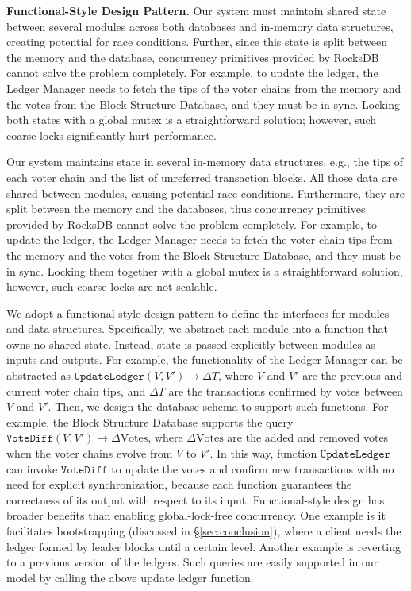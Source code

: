 \noindent\textbf{Functional-Style Design Pattern.}
Our system must maintain shared state between several modules across both databases and in-memory data structures, creating potential for race conditions. Further, since this state is split between the memory and the database, concurrency primitives provided by RocksDB cannot solve the problem completely. For example, to update the ledger, the Ledger Manager needs to fetch the tips of the voter chains from the memory and the votes from the Block Structure Database, and they must be in sync. Locking both states with a global mutex is a straightforward solution; however, such coarse locks significantly hurt performance. 

Our system maintains state in several in-memory data structures, e.g., the tips of each voter chain and the list of unreferred transaction blocks. All those data are shared between modules, causing potential race conditions. Furthermore, they are split between the memory and the databases, thus concurrency primitives provided by RocksDB cannot solve the problem completely. For example, to update the ledger, the Ledger Manager needs to fetch the voter chain tips from the memory and the votes from the Block Structure Database, and they must be in sync. Locking them together with a global mutex is a straightforward solution, however, such coarse locks are not scalable. 
\fi

We adopt a functional-style design pattern to define the interfaces for modules and data structures. Specifically, we abstract each module into a function that owns no shared state. Instead, state is passed explicitly between modules as inputs and outputs. For example, the functionality of the Ledger Manager can be abstracted as $\texttt{UpdateLedger}(V, V') \rightarrow \Delta T$, where $V$ and $V'$ are the previous and current voter chain tips, and $\Delta T$ are the transactions confirmed by votes between $V$ and $V'$. Then, we design the database schema to support such functions. For example, the Block Structure Database supports the query $\texttt{VoteDiff}(V, V') \rightarrow \Delta \text{Votes}$, where $\Delta \text{Votes}$ are the added and removed votes when the voter chains evolve from $V$ to $V'$. In this way, function $\texttt{UpdateLedger}$ can invoke $\texttt{VoteDiff}$ to update the votes and confirm new transactions with no need for explicit synchronization, because each function guarantees the correctness of its output with respect to its input. Functional-style design has broader benefits than enabling global-lock-free concurrency. One example is it facilitates bootstrapping (discussed in \S\ref{sec:conclusion}), where a client needs the ledger formed by leader blocks until a certain level. Another example is reverting to a previous version of the ledgers. Such queries are easily supported in our model by calling the above update ledger function. 


